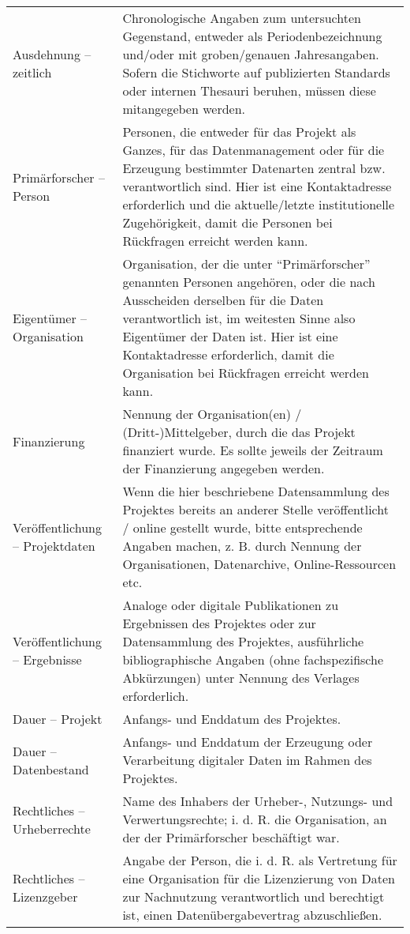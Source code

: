 \begin{center}
\begin{longtable}{L{0.25\textwidth} p{0.68\textwidth}}
		Ausdehnung -- zeitlich & Chronologische Angaben zum untersuchten Gegenstand, entweder als Periodenbezeichnung und/oder mit groben/genauen Jahresangaben. Sofern die Stichworte auf publizierten Standards oder internen Thesauri beruhen, müssen diese mitangegeben werden.\\
		Primärforscher -- Person & Personen, die entweder für das Projekt als Ganzes, für das Datenmanagement oder für die Erzeugung bestimmter Datenarten zentral bzw. verantwortlich sind. Hier ist eine Kontaktadresse erforderlich und die aktuelle/letzte institutionelle Zugehörigkeit, damit die Personen bei Rückfragen erreicht werden kann.\\
		Eigentümer -- Organisation & Organisation, der die unter "`Primärforscher"' genannten Personen angehören, oder die nach Ausscheiden derselben für die Daten verantwortlich ist, im weitesten Sinne also Eigentümer der Daten ist. Hier ist eine Kontaktadresse erforderlich, damit die Organisation bei Rückfragen erreicht werden kann.\\
		Finanzierung & Nennung der Organisation(en) / (Dritt-)Mittelgeber, durch die das Projekt finanziert wurde. Es sollte jeweils der Zeitraum der Finanzierung angegeben werden.\\
		Veröffentlichung -- Projektdaten & Wenn die hier beschriebene Datensammlung des Projektes bereits an anderer Stelle veröffentlicht / online gestellt wurde, bitte entsprechende Angaben machen, z. B. durch Nennung der Organisationen, Datenarchive, Online-Ressourcen etc.\\
		Veröffentlichung -- Ergebnisse & Analoge oder digitale Publikationen zu Ergebnissen des Projektes oder zur Datensammlung des Projektes, ausführliche bibliographische Angaben (ohne fachspezifische Abkürzungen) unter Nennung des Verlages erforderlich.\\
		Dauer -- Projekt & Anfangs- und Enddatum des Projektes.\\
		Dauer -- Datenbestand & Anfangs- und Enddatum der Erzeugung oder Verarbeitung digitaler Daten im Rahmen des Projektes.\\
		Rechtliches -- Urheberrechte & Name des Inhabers der Urheber-, Nutzungs- und Verwertungsrechte; i. d. R. die Organisation, an der der Primärforscher beschäftigt war.\\
		Rechtliches -- Lizenzgeber & Angabe der Person, die i. d. R. als Vertretung für eine Organisation für die Lizenzierung von Daten zur Nachnutzung verantwortlich und berechtigt ist, einen Datenübergabevertrag abzuschließen.\\

\end{longtable}
\end{center}
